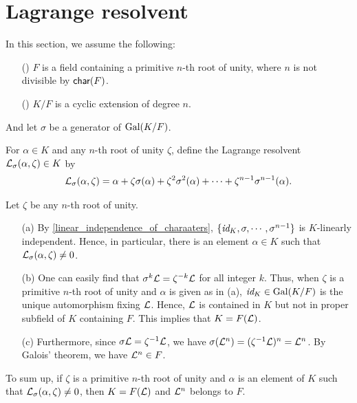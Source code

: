 \section{Lagrange resolvent}\label{Lagrange_resolvent}

In this section, we assume the following:
\begin{enumerate}
    \item[(\romannumeral 1)]
    {
        $F$ is a field containing a primitive $n$-th root of unity, where $n$ is not divisible by ${\textsf{char}({F})}$.
    }
    \item[(\romannumeral 2)]
    {
        $K/F$ is a cyclic extension of degree $n$.
    }
\end{enumerate}
And let $\sigma$ be a generator of ${\textrm{Gal}({K/F})}$.

\begin{defi}
    For $\alpha\in K$ and any $n$-th root of unity $\zeta$, define the Lagrange resolvent ${\mathcal{L}}_\sigma(\alpha, \zeta)\in K$ by
    \begin{align*}
        {\mathcal{L}}_\sigma(\alpha, \zeta)=\alpha+\zeta\sigma(\alpha)+\zeta^2\sigma^2(\alpha)+\cdots+\zeta^{n-1}\sigma^{n-1}(\alpha).
    \end{align*}
\end{defi}
\begin{obs}\label{the proof of cyclic->radical}
    Let $\zeta$ be any $n$-th root of unity.
    \begin{enumerate}
        \item[(a)]
        {
            By \cref{linear_independence_of_charaaters}, $\{\textit{id}_{K}, \sigma, \cdots, \sigma^{n-1}\}$ is $K$-linearly independent.
            Hence, in particular, there is an element $\alpha\in K$ such that ${\mathcal{L}}_\sigma(\alpha, \zeta)\neq 0$.
        }
        \item[(b)]
        {
            One can easily find that $\sigma^k{\mathcal{L}}=\zeta^{-k}{\mathcal{L}}$ for all integer $k$.
            Thus, when $\zeta$ is a primitive $n$-th root of unity and $\alpha$ is given as in (a), $\textit{id}_{K}\in{\textrm{Gal}({K/F})}$ is the unique automorphism fixing ${\mathcal{L}}$.
            Hence, ${\mathcal{L}}$ is contained in $K$ but not in proper subfield of $K$ containing $F$.
            This implies that $K=F({\mathcal{L}})$.
        }
        \item[(c)]
        {
            Furthermore, since $\sigma{\mathcal{L}}=\zeta^{-1}{\mathcal{L}}$, we have $\sigma({\mathcal{L}}^n)=(\zeta^{-1}{\mathcal{L}})^n={\mathcal{L}}^n$.
            By Galois' theorem, we have ${\mathcal{L}}^n\in F$.
        }
    \end{enumerate}
    To sum up, if $\zeta$ is a primitive $n$-th root of unity and $\alpha$ is an element of $K$ such that ${\mathcal{L}}_\sigma(\alpha, \zeta)\neq 0$, then $K=F({\mathcal{L}})$ and ${\mathcal{L}}^n$ belongs to $F$.
\end{obs}